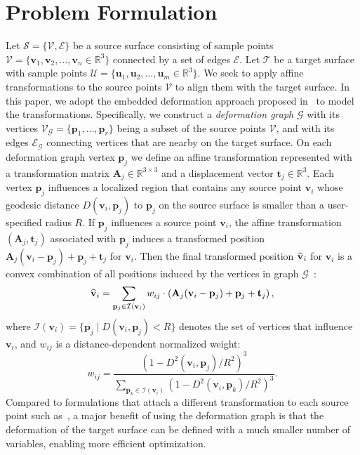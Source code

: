 \section{Problem Formulation}
Let $\mathcal{S}=\{\mathcal{V},\mathcal{E}\}$ be a source surface consisting of sample points $\mathcal{V}=\{\mathbf{v}_1, \mathbf{v}_2, \ldots, \mathbf{v}_n \in \mathbb{R}^3\}$ connected by a set of edges $\mathcal{E}$. Let $\mathcal{T}$ be a target surface with sample points $\mathcal{U}=\{\mathbf{u}_1, \mathbf{u}_2, \ldots, \mathbf{u}_m \in \mathbb{R}^3 \}$.
We seek to apply affine transformations to the source points $\mathcal{V}$ to align them with the target surface.
In this paper, we adopt the embedded deformation approach proposed in~\cite{sumner2007embedded} to model the transformations. Specifically, we construct a \emph{deformation graph} $\mathcal{G}$ with its vertices $\mathcal{V}_{\mathcal{G}} = \{\mathbf{p}_1,\ldots,\mathbf{p}_r\}$ being a subset of the source points $\mathcal{V}$, and with its edges $\mathcal{E}_{\mathcal{G}}$ connecting vertices that are nearby on the target surface.
On each deformation graph vertex $\mathbf{p}_j$ we define an affine transformation represented with a transformation matrix $\mathbf{A}_j \in \mathbb{R}^{3 \times 3}$ and a displacement vector $\mathbf{t}_j \in \mathbb{R}^3$. Each vertex $\mathbf{p}_j$ influences a localized region that contains any source point $\mathbf{v}_i$ whose geodesic distance $D(\mathbf{v}_i, \mathbf{p}_j)$ to $\mathbf{p}_j$ on the source surface is smaller than a user-specified radius $R$. If $\mathbf{p}_j$ influences a source point $\mathbf{v}_i$, the affine transformation $(\mathbf{A}_j, \mathbf{t}_j)$ associated with $\mathbf{p}_j$ induces a transformed position $\mathbf{A}_j(\mathbf{v}_i-\mathbf{p}_j)+\mathbf{p}_j + \mathbf{t}_j$ for $\mathbf{v}_i$.
Then the final transformed position $\widehat{\mathbf{v}}_i$ for $\mathbf{v}_i$ is a convex combination of all positions induced by the vertices in graph $\mathcal{G}$~\cite{li2009robust}:
\begin{equation}
\label{eq:sample_represent}
\widehat{\mathbf{v}}_i =  \sum_{\mathbf{p}_j \in \mathcal{I}(\mathbf{v}_i)} {w}_{ij} \cdot \left(\mathbf{A}_j(\mathbf{v}_i-\mathbf{p}_j)+\mathbf{p}_j + \mathbf{t}_j\right),
\end{equation}
where $\mathcal{I}(\mathbf{v}_i) = \{\mathbf{p}_j \mid D(\mathbf{v}_i, \mathbf{p}_j)<R \}$ denotes the set of vertices that influence $\mathbf{v}_i$, and ${w}_{ij}$ is a distance-dependent normalized weight:
\[
    {w}_{ij} = \frac{\left( 1 - {D^2(\mathbf{v}_i, \mathbf{p}_j)}/{R^2}\right)^3}
    {\sum_{\mathbf{p}_k \in \mathcal{I}(\mathbf{v}_i)} \left( 1 - {D^2(\mathbf{v}_i, \mathbf{p}_k)}/{R^2}\right)^3}.
\]
Compared to formulations that attach a different transformation to each source point such as~\cite{li2018robust}, a major benefit of using the deformation graph is that the deformation of the target surface can be defined with a much smaller number of variables, enabling more efficient optimization.

